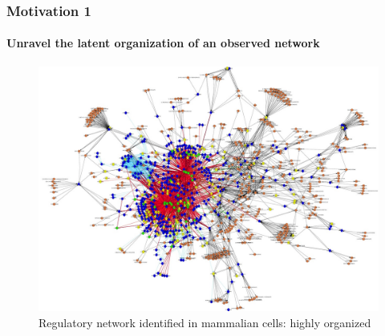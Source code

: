 \documentclass{beamer}\usepackage[]{graphicx}\usepackage[]{color}
\begin{document}
\begin{frame}
  \frametitle{Motivation 1}
  \framesubtitle{Unravel the latent organization of an observed network}

  \begin{figure}
    \centering
    \includegraphics[width=.8\textwidth]{figures/net_reg_mamalians}
    \caption{\small Regulatory network  identified in mammalian cells:
      \alert{highly organized}}
  \end{figure}
\end{frame}
\end{document}
